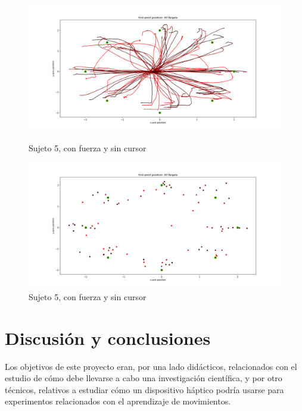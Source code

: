\documentclass[a4paper,11pt, oneside]{book}
\begin{document}
\begin{figure}[H]
	\begin{minipage}[b]{0.5\linewidth}
		\centering
		\includegraphics[width=\linewidth]{sujeto5/force_no_cursor/trayectorias}
		\caption{Sujeto 5, con fuerza y sin cursor}
		\label{5-fase4-1}
	\end{minipage}
	\hspace{0.5cm}
	\begin{minipage}[b]{0.5\linewidth}
		\centering
		\includegraphics[width=\linewidth]{sujeto5/force_no_cursor/trayectorias_puntos}
		\caption{Sujeto 5, con fuerza y sin cursor}
		\label{5-fase4-2}
	\end{minipage}
\end{figure}


\chapter{Discusión y conclusiones}

Los objetivos de este proyecto eran, por una lado didácticos, relacionados con el estudio de cómo debe llevarse a cabo una investigación científica, y por otro técnicos, relativos a estudiar cómo un dispositivo háptico podría usarse para experimentos relacionados con el aprendizaje de movimientos.
\end{document}
